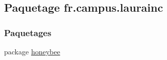 \hypertarget{namespacefr_1_1campus_1_1laurainc}{}\subsection{Paquetage fr.\+campus.\+laurainc}
\label{namespacefr_1_1campus_1_1laurainc}
\subsubsection*{Paquetages}
\begin{DoxyCompactItemize}
\item 
package \hyperlink{namespacefr_1_1campus_1_1laurainc_1_1honeybee}{honeybee}
\end{DoxyCompactItemize}
